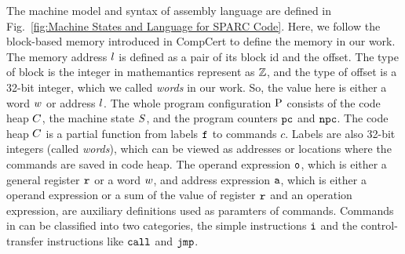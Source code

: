 		
		

The machine model and syntax of \sparc{} assembly language
are defined in Fig.~\ref{fig:Machine States and Language for SPARC Code}. 
Here, we follow the block-based memory \cite{CompCertMM} introduced 
in CompCert to define the memory in our work.   
The memory address $l$ is defined as a pair of 
its block id and the offset. The type of block is the integer 
in mathemantics represent as $\mathbb{Z}$, and the type of offset 
is a 32-bit integer, which we called {\it words} in our work. 
So, the value here is either a word $w$ or address $l$.  
The whole program configuration $\text{P}$ consists of the code heap
$C$, the machine state $S$, and the program counters $\texttt{pc}$
and $\texttt{npc}$.
The code heap $C$ is a partial function
from labels $\texttt{f}_{}$ to commands $c$.
Labels are also 32-bit integers (called {\em words}),
which can be viewed as addresses or locations 
where the commands are saved in code heap. 
The operand expression $\texttt{o}$, which is either a general 
register $\texttt{r}_{}$ or a word $w$, 
and address expression $\texttt{a}$, 
which is either a operand expression or a 
sum of the value of register $\texttt{r}_{}$ and an operation 
expression, are auxiliary definitions used as paramters of commands. 
Commands in \sparc{} can be classified into two categories,
the simple instructions $\texttt{i}$ and the
control-transfer instructions like $\texttt{call}$ and $\texttt{jmp}$.

